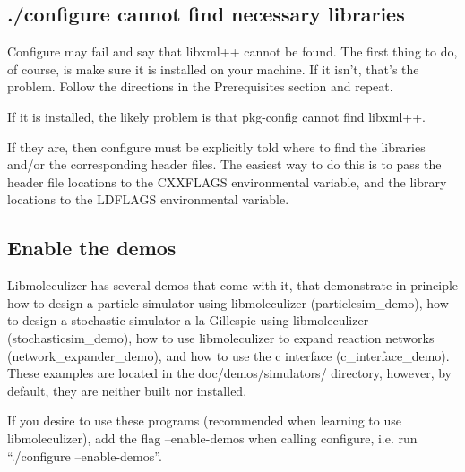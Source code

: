 \subsection{./configure cannot find necessary libraries}
Configure may fail and say that libxml++ cannot be found.  The first
thing to do, of course, is make sure it is installed on
your machine.  If it isn't, that's the problem.  Follow the directions
in the Prerequisites section and repeat.

If it is installed, the likely problem is that pkg-config cannot find
libxml++.  



If they are, then configure must be explicitly told
where to find the libraries and/or the corresponding header files. The
easiest way to do this is to pass the header file locations to the
CXXFLAGS environmental variable, and the library locations to the
LDFLAGS environmental variable.

\subsection{Enable the demos}
Libmoleculizer has several demos that come with it, that demonstrate
in principle how to design a particle simulator using libmoleculizer
(particlesim\_demo), how to design a stochastic simulator a la
Gillespie using libmoleculizer (stochasticsim\_demo), how to use
libmoleculizer to expand reaction networks (network\_expander\_demo),
and how to use the c interface (c\_interface\_demo).  These examples are
located in the doc/demos/simulators/ directory, however, by default,
they are neither built nor installed.  

If you desire to use these programs (recommended when learning to use
libmoleculizer), add the flag --enable-demos when calling configure,
i.e. run ``./configure --enable-demos''.  

